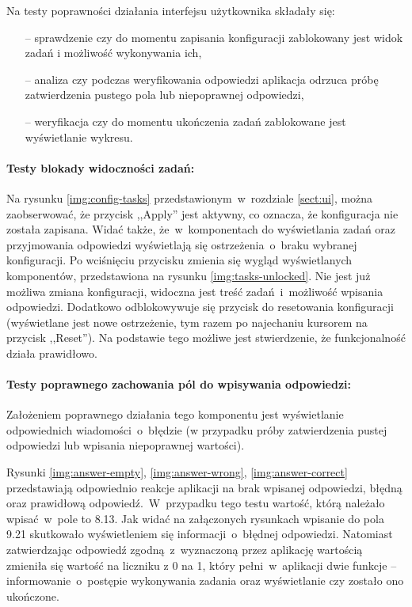 Na testy poprawności działania interfejsu użytkownika składały się:
\begin{itemize}
  \item [--] sprawdzenie czy do momentu zapisania konfiguracji zablokowany jest widok zadań i
        możliwość wykonywania ich,
  \item [--] analiza czy podczas weryfikowania odpowiedzi aplikacja odrzuca próbę zatwierdzenia
        pustego pola lub niepoprawnej odpowiedzi,
  \item [--] weryfikacja czy do momentu ukończenia zadań zablokowane jest wyświetlanie wykresu.
\end{itemize}

\paragraph{Testy blokady widoczności zadań:} Na rysunku \ref{img:config-tasks}
przedstawionym~w~rozdziale \ref{sect:ui}, można zaobserwować, że przycisk ,,Apply'' jest aktywny, co
oznacza, że konfiguracja nie została zapisana. Widać także, że~w~komponentach do wyświetlania zadań
oraz przyjmowania odpowiedzi wyświetlają się ostrzeżenia~o~braku wybranej konfiguracji. Po
wciśnięciu przycisku zmienia się wygląd wyświetlanych komponentów, przedstawiona na rysunku
\ref{img:tasks-unlocked}. Nie jest już możliwa zmiana konfiguracji, widoczna jest treść
zadań~i~możliwość wpisania odpowiedzi. Dodatkowo odblokowywuje się przycisk do resetowania
konfiguracji (wyświetlane jest nowe ostrzeżenie, tym razem po najechaniu kursorem na przycisk
,,Reset''). Na podstawie tego możliwe jest stwierdzenie, że funkcjonalność działa prawidłowo.


\paragraph{Testy poprawnego zachowania pól do wpisywania odpowiedzi:} Założeniem poprawnego
działania tego komponentu jest wyświetlanie odpowiednich wiadomości~o~błędzie (w przypadku próby
zatwierdzenia pustej odpowiedzi lub wpisania niepoprawnej wartości).

Rysunki \ref{img:answer-empty}, \ref{img:answer-wrong}, \ref{img:answer-correct} przedstawiają
odpowiednio reakcje aplikacji na brak wpisanej odpowiedzi, błędną oraz prawidłową
odpowiedź.~W~przypadku tego testu wartość, którą należało wpisać~w~pole to 8.13. Jak widać na
załączonych rysunkach wpisanie do pola 9.21 skutkowało wyświetleniem się informacji~o~błędnej
odpowiedzi. Natomiast zatwierdzając odpowiedź zgodną~z~wyznaczoną przez aplikację wartością zmieniła
się wartość na liczniku z 0 na 1, który pełni~w~aplikacji dwie funkcje -- informowanie~o~postępie
wykonywania zadania oraz wyświetlanie czy zostało ono ukończone.

